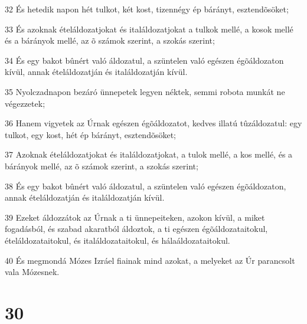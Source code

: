 \par 32 És hetedik napon hét tulkot, két kost, tizennégy ép bárányt, esztendõsöket;
\par 33 És azoknak ételáldozatjokat és italáldozatjokat a tulkok mellé, a kosok mellé és a bárányok mellé, az õ számok szerint, a szokás szerint;
\par 34 És egy bakot bûnért való áldozatul, a szüntelen való egészen égõáldozaton kívül, annak ételáldozatján és italáldozatján kívül.
\par 35 Nyolczadnapon bezáró ünnepetek legyen néktek, semmi robota munkát ne végezzetek;
\par 36 Hanem vigyetek az Úrnak egészen égõáldozatot, kedves illatú tûzáldozatul: egy tulkot, egy kost, hét ép bárányt, esztendõsöket;
\par 37 Azoknak ételáldozatjokat és italáldozatjokat, a tulok mellé, a kos mellé, és a bárányok mellé, az õ számok szerint, a szokás szerint;
\par 38 És egy bakot bûnért való áldozatul, a szüntelen való egészen égõáldozaton, annak ételáldozatján és italáldozatján kívül.
\par 39 Ezeket áldozzátok az Úrnak a ti ünnepeiteken, azokon kívül, a miket fogadásból, és szabad akaratból áldoztok, a ti egészen égõáldozataitokul, ételáldozataitokul, és italáldozataitokul, és hálaáldozataitokul.
\par 40 És megmondá Mózes Izráel fiainak mind azokat, a melyeket az Úr parancsolt vala Mózesnek.

\chapter{30}

